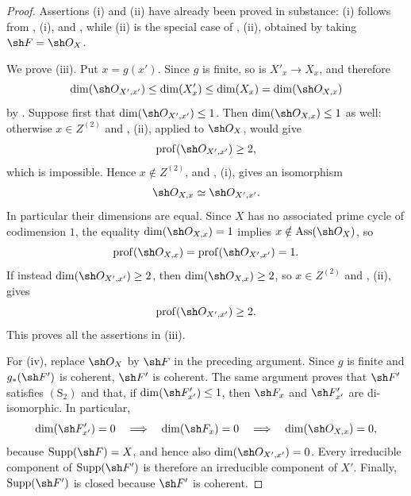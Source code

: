 \begin{proof}
Assertions {\rm(i)} and {\rm(ii)} have already been proved in
substance: {\rm(i)} follows from , {\rm(i)}, and
, while {\rm(ii)} is the special case of
, {\rm(ii)}, obtained by taking
$\sh F=\sh O_X$.

We prove {\rm(iii)}.  Put $x=g(x')$.  Since $g$ is finite, so is
$X'_x\to X_x$, and therefore
\[
  \dim(\sh O_{X',x'})
  \leq \dim(X'_x)
  \leq \dim(X_x)
  =\dim(\sh O_{X,x})
\]
by .  Suppose first that
$\dim(\sh O_{X',x'})\leq1$.  Then
$\dim(\sh O_{X,x})\leq1$ as well: otherwise $x\in Z^{(2)}$ and
, {\rm(ii)}, applied to $\sh O_X$, would give
\[
  \operatorname{prof}(\sh O_{X',x'})\geq2,
\]
which is impossible.  Hence $x\notin Z^{(2)}$, and
, {\rm(i)}, gives an isomorphism
\[
  \sh O_{X,x}\simeq\sh O_{X',x'}.
\]
In particular their dimensions are equal.  Since $X$ has no
associated prime cycle of codimension $1$, the equality
$\dim(\sh O_{X,x})=1$ implies
$x\notin\operatorname{Ass}(\sh O_X)$, so
\[
  \operatorname{prof}(\sh O_{X,x})
  =\operatorname{prof}(\sh O_{X',x'})=1.
\]
If instead $\dim(\sh O_{X',x'})\geq2$, then
$\dim(\sh O_{X,x})\geq2$, so $x\in Z^{(2)}$ and
, {\rm(ii)}, gives
\[
  \operatorname{prof}(\sh O_{X',x'})\geq2.
\]
This proves all the assertions in {\rm(iii)}.


For {\rm(iv)}, replace $\sh O_X$ by $\sh F$ in the preceding
argument.  Since $g$ is finite and $g_*(\sh F')$ is coherent,
$\sh F'$ is coherent.  The same argument proves that $\sh F'$
satisfies $(\mathrm S_2)$ and that, if
$\dim(\sh F'_{x'})\leq1$, then $\sh F_x$ and
$\sh F'_{x'}$ are di-isomorphic.  In particular,
\[
  \dim(\sh F'_{x'})=0
  \quad\Longrightarrow\quad
  \dim(\sh F_x)=0
  \quad\Longrightarrow\quad
  \dim(\sh O_{X,x})=0,
\]
because $\operatorname{Supp}(\sh F)=X$, and hence also
$\dim(\sh O_{X',x'})=0$.  Every irreducible component of
$\operatorname{Supp}(\sh F')$ is therefore an irreducible
component of $X'$.  Finally, $\operatorname{Supp}(\sh F')$ is
closed because $\sh F'$ is coherent.
\end{proof}

